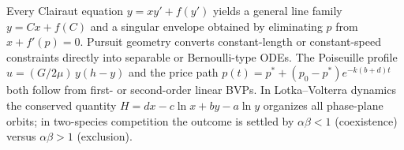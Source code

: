\begin{conceptbox}
Every Clairaut equation $y = xy' + f(y')$ yields a \textcolor{accentorange}{general
line family $y = Cx + f(C)$} and a \textcolor{accentorange}{singular envelope}
obtained by eliminating $p$ from $x + f'(p) = 0$. Pursuit geometry
converts constant-length or constant-speed constraints directly into separable
or Bernoulli-type ODEs. The Poiseuille profile
\textcolor{accentorange}{$u = (G/2\mu)\,y(h-y)$} and the price path
\textcolor{accentorange}{$p(t) = p^* + (p_0 - p^*)e^{-k(b+d)t}$} both follow
from first- or second-order linear BVPs. In Lotka--Volterra dynamics the
\textcolor{accentorange}{conserved quantity $H = dx - c\ln x + by - a\ln y$}
organizes all phase-plane orbits; in two-species competition the outcome
is settled by \textcolor{accentorange}{$\alpha\beta < 1$ (coexistence) versus
$\alpha\beta > 1$ (exclusion)}.
\end{conceptbox}


